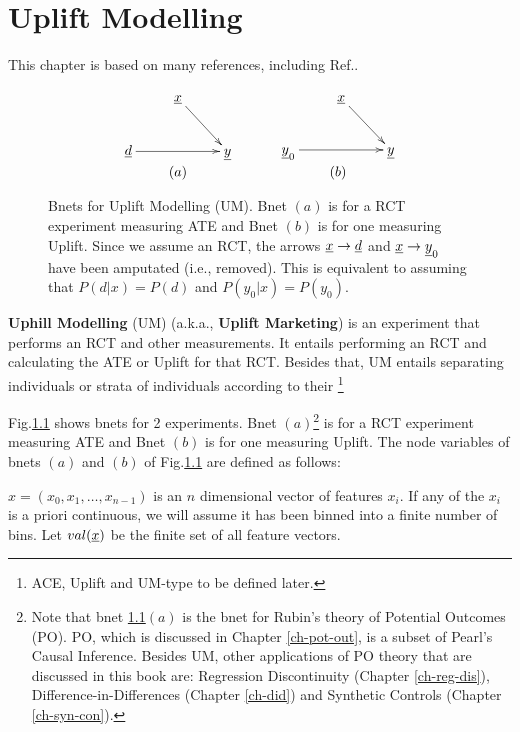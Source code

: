 \chapter{Uplift Modelling}
\label{ch-uplift}



This chapter is based 
on 
many references,
including Ref.\cite{uplift-2017, fei, wiki-uplift,jaros}.

\begin{figure}[h!]
$$\begin{array}{ccc}
\xymatrix{
&\rvx\ar[dr]
\\
\rvd\ar[rr]
&&\rvy
}
&\quad&
\xymatrix{
&\rvx\ar[dr]
\\
\rvy_0\ar[rr]
&&\rvy
}
\\
(a) &\quad & (b)
\end{array}
$$
\caption{Bnets for Uplift Modelling (UM). 
Bnet $(a)$ is for a RCT experiment measuring ATE and Bnet $(b)$ is for one measuring Uplift. 
 Since we assume an RCT, the arrows $\rvx\rarrow \rvd$ 
and $\rvx\rarrow \rvy_0$ have been amputated (i.e., removed). This is equivalent to assuming that $P(d|x)=P(d)$ and
$P(y_0|x)=P(y_0)$.
}
\label{fig-up-bnet}
\end{figure}



{\bf Uphill Modelling} (UM) (a.k.a., {\bf Uplift Marketing})
is an experiment that performs an
RCT and other measurements. It 
entails performing an
RCT and 
 calculating  the ATE or Uplift for that  RCT.
 Besides that, UM entails 
separating 
individuals or strata of individuals according to their \footnote{ACE, Uplift and UM-type to be defined later.}



Fig.\ref{fig-up-bnet} shows bnets for 2 experiments. Bnet $(a)$\footnote{
Note that bnet \ref{fig-up-bnet}$(a)$ 
is the bnet for Rubin's theory of 
Potential Outcomes (PO).
PO, which is
discussed in Chapter \ref{ch-pot-out},
 is a subset
of Pearl's Causal Inference.
Besides UM, other  applications of PO theory
that are discussed in this book 
are: Regression Discontinuity (Chapter \ref{ch-reg-dis}),
Difference-in-Differences (Chapter \ref{ch-did})
and Synthetic Controls (Chapter \ref{ch-syn-con}).} is for a RCT experiment measuring ATE and Bnet $(b)$ is for one measuring Uplift. 
The node variables of bnets $(a)$ and $(b)$ of Fig.\ref{fig-up-bnet}
are defined as follows:

$x=(x_0, x_1,\dots, x_{n-1})$ is an $n$ dimensional 
vector of features $x_i$. If any of the $x_i$
is a priori continuous, we will
assume it has  been binned into
a finite number of bins.
Let $val(\rvx)$ be the finite set of  all feature vectors.

